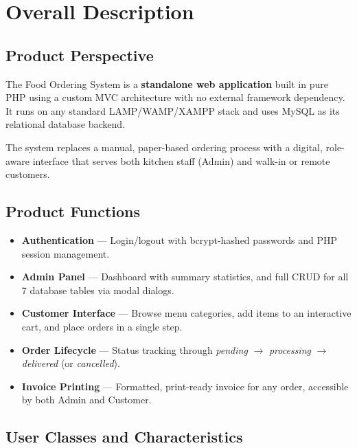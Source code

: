 \documentclass[12pt,a4paper]{article}
\begin{document}
\section{Overall Description}

\subsection{Product Perspective}

The Food Ordering System is a \textbf{standalone web application} built in pure PHP using
a custom MVC architecture with no external framework dependency. It runs on any standard
LAMP/WAMP/XAMPP stack and uses MySQL as its relational database backend.

The system replaces a manual, paper-based ordering process with a digital, role-aware
interface that serves both kitchen staff (Admin) and walk-in or remote customers.

\subsection{Product Functions}

\begin{tcolorbox}[reqstyle]
\begin{itemize}[leftmargin=1.5em, itemsep=4pt]
  \item \textbf{Authentication} --- Login/logout with bcrypt-hashed passwords and PHP
        session management.
  \item \textbf{Admin Panel} --- Dashboard with summary statistics, and full CRUD for
        all 7 database tables via modal dialogs.
  \item \textbf{Customer Interface} --- Browse menu categories, add items to an interactive
        cart, and place orders in a single step.
  \item \textbf{Order Lifecycle} --- Status tracking through
        \textit{pending} $\rightarrow$ \textit{processing} $\rightarrow$ \textit{delivered}
        (or \textit{cancelled}).
  \item \textbf{Invoice Printing} --- Formatted, print-ready invoice for any order,
        accessible by both Admin and Customer.
\end{itemize}
\end{tcolorbox}

\subsection{User Classes and Characteristics}
\end{document}
